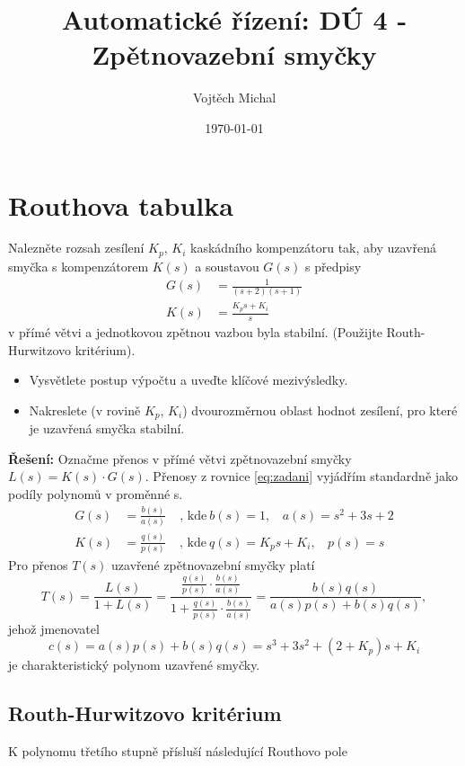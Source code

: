 \documentclass[twoside]{article}
\title{Automatické řízení: DÚ 4 - Zpětnovazební smyčky}
\author{Vojtěch Michal}
\date{\today}
\begin{document}
\maketitle

\section{Routhova tabulka}
Nalezněte rozsah zesílení $K_p$, $K_i$ kaskádního kompenzátoru tak, aby uzavřená smyčka s kompenzátorem $K(s)$ a soustavou $G(s)$
s předpisy
\begin{equation}
	\begin{split}
		\label{eq:zadani}
		G(s) &= \frac{1}{(s+2)(s+1)} \\
		K(s) &= \frac{K_p s + K_i}{s}
	\end{split}
\end{equation}
v přímé větvi a jednotkovou zpětnou vazbou byla stabilní. (Použijte Routh-Hurwitzovo kritérium).
\begin{itemize}
	\item Vysvětlete postup výpočtu a uveďte klíčové mezivýsledky.
	\item Nakreslete (v rovině $K_p$, $K_i$) dvourozměrnou oblast hodnot zesílení, pro které je uzavřená smyčka stabilní.
\end{itemize}
\textbf{Řešení:} 
Označme přenos v přímé větvi zpětnovazební smyčky $L(s) = K(s) \cdot G(s)$. Přenosy z rovnice \eqref{eq:zadani} 
vyjádřím standardně jako podíly polynomů v proměnné s. 
\begin{equation}
	\begin{split}
		G(s) &= \frac{b(s)}{a(s)} ~~~~~ \text{, kde} ~ b(s) = 1,~~~~ a(s) = s^2 + 3s + 2 \\
		K(s) &= \frac{q(s)}{p(s)} ~~~~~ \text{, kde} ~ q(s) = K_p s + K_i,~~~~ p(s) = s 
	\end{split}
\end{equation}
Pro přenos $T(s)$ uzavřené zpětnovazební smyčky platí
\begin{equation}
	T(s) = \frac{L(s)}{1 + L(s)} = \frac{\frac{q(s)}{p(s)} \cdot \frac{b(s)}{a(s)}}{1 + \frac{q(s)}{p(s)} \cdot \frac{b(s)}{a(s)}}
	=  \frac{b(s)q(s)}{a(s)p(s) + b(s)q(s)},
\end{equation}
jehož jmenovatel
\begin{equation}
	c(s) = a(s)p(s) + b(s)q(s) = s^3 + 3s^2 + (2+ K_p)s + K_i
	\label{eq:char_polynom}
\end{equation}
je charakteristický polynom uzavřené smyčky.
\subsection{Routh-Hurwitzovo kritérium}
K polynomu třetího stupně přísluší následující Routhovo pole
\end{document}

